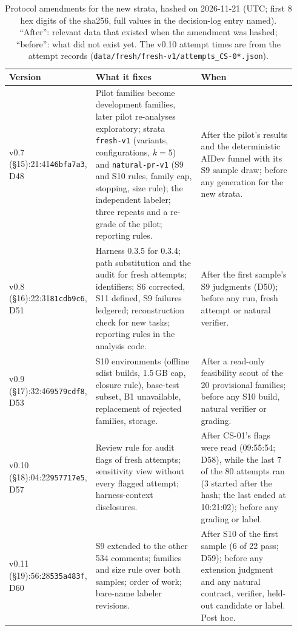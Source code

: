 \begin{table}[t]\centering\footnotesize
\caption{Protocol amendments for the new strata, hashed on 2026-11-21 (UTC; first 8 hex digits of the sha256, full values in the decision-log entry named). ``After'': relevant data that existed when the amendment was hashed; ``before'': what did not exist yet. The v0.10 attempt times are from the attempt records (\texttt{data/fresh/fresh-v1/attempts\_CS-0*.json}).}\label{tab:amendments}
\begin{tabular}{@{}p{0.14\linewidth}p{0.42\linewidth}p{0.38\linewidth}@{}}\toprule
Version & What it fixes & When \\\midrule
v0.7 (\S15)\newline 03:21:41\newline \texttt{46bfa7a3}, D48 & Pilot families become development families, later pilot re-analyses exploratory; strata \texttt{fresh-v1} (variants, configurations, $k=5$) and \texttt{natural-pr-v1} (S9 and S10 rules, family cap, stopping, size rule); the independent labeler; three repeats and a re-grade of the pilot; reporting rules. & After the pilot's results and the deterministic AIDev funnel with its S9 sample draw; before any generation for the new strata. \\
v0.8 (\S16)\newline 06:22:31\newline \texttt{81cdb9c6}, D51 & Harness 0.3.5 for 0.3.4; path substitution and the audit for fresh attempts; identifiers; S6 corrected, S11 defined, S9 failures ledgered; reconstruction check for new tasks; reporting rules in the analysis code. & After the first sample's S9 judgments (D50); before any run, fresh attempt or natural verifier. \\
v0.9 (\S17)\newline 07:32:46\newline \texttt{9579cdf8}, D53 & S10 environments (offline sdist builds, 1.5\,GB cap, closure rule), base-test subset, B1 unavailable, replacement of rejected families, storage. & After a read-only feasibility scout of the 20 provisional families; before any S10 build, natural verifier or grading. \\
v0.10 (\S18)\newline 10:04:22\newline \texttt{957717e5}, D57 & Review rule for audit flags of fresh attempts; sensitivity view without every flagged attempt; harness-context disclosures. & After CS-01's flags were read (09:55:54; D58), while the last 7 of the 80 attempts ran (3 started after the hash; the last ended at 10:21:02); before any grading or label. \\
v0.11 (\S19)\newline 11:56:28\newline \texttt{535a483f}, D60 & S9 extended to the other 534 comments; families and size rule over both samples; order of work; bare-name labeler revisions. & After S10 of the first sample (6 of 22 pass; D59); before any extension judgment and any natural contract, verifier, held-out candidate or label. Post hoc. \\
\bottomrule\end{tabular}\end{table}


